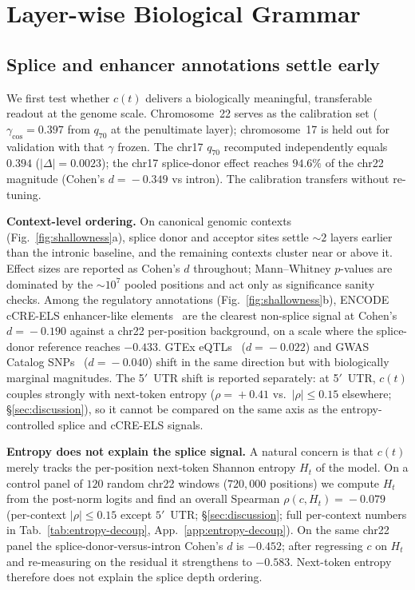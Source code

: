 \documentclass{article}
\theoremstyle{plain}
\theoremstyle{definition}
\theoremstyle{remark}
\begin{document}
\section{Layer-wise Biological Grammar}
\label{sec:utility}

\subsection{Splice and enhancer annotations settle early}
\label{sec:shallowness}

We first test whether $c(t)$ delivers a biologically meaningful, transferable readout at the genome scale. Chromosome~22 serves as the calibration set ($\gamma_{\cos}\!=\!0.397$ from $q_{70}$ at the penultimate layer); chromosome~17 is held out for validation with that $\gamma$ frozen. The chr17 $q_{70}$ recomputed independently equals $0.394$ ($|\Delta|\!=\!0.0023$); the chr17 splice-donor effect reaches $94.6\%$ of the chr22 magnitude (Cohen's $d\!=\!-0.349$ vs intron). The calibration transfers without re-tuning.

\textbf{Context-level ordering.} On canonical genomic contexts (Fig.~\ref{fig:shallowness}a), splice donor and acceptor sites settle $\sim 2$ layers earlier than the intronic baseline, and the remaining contexts cluster near or above it. Effect sizes are reported as Cohen's $d$ throughout; Mann--Whitney $p$-values are dominated by the $\sim\!10^7$ pooled positions and act only as significance sanity checks. Among the regulatory annotations (Fig.~\ref{fig:shallowness}b), ENCODE cCRE-ELS enhancer-like elements~\cite{moore2020encode} are the clearest non-splice signal at Cohen's $d\!=\!-0.190$ against a chr22 per-position background, on a scale where the splice-donor reference reaches $-0.433$. GTEx eQTLs~\cite{gtex2020} ($d\!=\!-0.022$) and GWAS Catalog SNPs~\cite{sollis2023gwas} ($d\!=\!-0.040$) shift in the same direction but with biologically marginal magnitudes. The 5$'$~UTR shift is reported separately: at 5$'$~UTR, $c(t)$ couples strongly with next-token entropy ($\rho\!=\!+0.41$ vs.\ $|\rho|\!\le\!0.15$ elsewhere; \S\ref{sec:discussion}), so it cannot be compared on the same axis as the entropy-controlled splice and cCRE-ELS signals.

\textbf{Entropy does not explain the splice signal.} A natural concern is that $c(t)$ merely tracks the per-position next-token Shannon entropy $H_t$ of the model. On a control panel of $120$ random chr22 windows ($720{,}000$ positions) we compute $H_t$ from the post-norm logits and find an overall Spearman $\rho(c, H_t)\!=\!-0.079$ (per-context $|\rho|\!\le\!0.15$ except $5'$~UTR; \S\ref{sec:discussion}; full per-context numbers in Tab.~\ref{tab:entropy-decoup}, App.~\ref{app:entropy-decoup}). On the same chr22 panel the splice-donor-versus-intron Cohen's $d$ is $-0.452$; after regressing $c$ on $H_t$ and re-measuring on the residual it strengthens to $-0.583$. Next-token entropy therefore does not explain the splice depth ordering.
\end{document}

